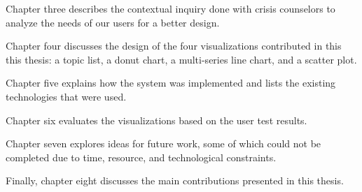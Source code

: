 Chapter three describes the contextual inquiry done with crisis counselors to
analyze the needs of our users for a better design.

Chapter four discusses the design of the four visualizations contributed in this
this thesis: a topic list, a donut chart, a multi-series line chart, and a scatter plot.

Chapter five explains how the system was implemented and lists the existing
technologies that were used.

Chapter six evaluates the visualizations based on the user test results.

Chapter seven explores ideas for future work, some of which could not be completed
due to time, resource, and technological constraints.

Finally, chapter eight discusses the main contributions presented in this thesis.
